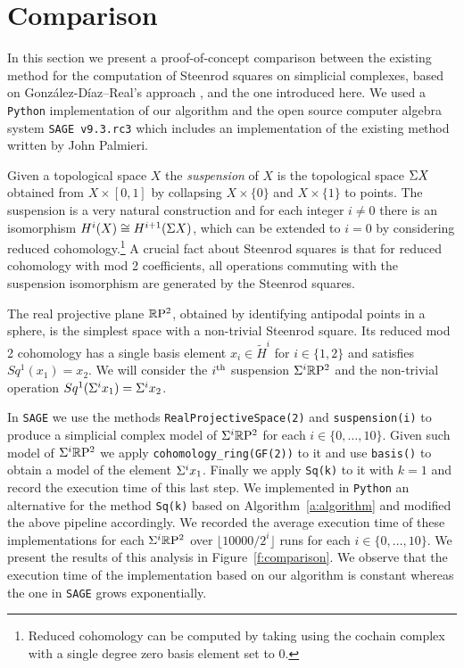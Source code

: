
\section{Comparison} \label{s:comparison}

In this section we present a proof-of-concept comparison between the existing method for the computation of Steenrod squares on simplicial complexes, based on Gonz\'alez-D\'iaz--Real's approach \cite[Corollary 3.2]{gonzalez1999combinatorial}, and the one introduced here.
We used a \verb|Python| implementation of our algorithm and the open source computer algebra system \verb|SAGE v9.3.rc3| \cite{sagemath} which includes an implementation of the existing method written by John Palmieri.

Given a topological space $X$ the \textit{suspension} of $X$ is the topological space $\Sigma X$ obtained from $X \times [0,1]$ by collapsing $X \times \{0\}$ and $X \times \{1\}$ to points.
The suspension is a very natural construction and for each integer $i \neq 0$ there is an isomorphism $H^i(X) \cong H^{i+1}(\Sigma X)$, which can be extended to $i = 0$ by considering reduced cohomology.\footnote{Reduced cohomology can be computed by taking using the cochain complex with a single degree zero basis element set to $0$.}
A crucial fact about Steenrod squares is that for reduced cohomology with mod 2 coefficients, all operations commuting with the suspension isomorphism are generated by the Steenrod squares.

The real projective plane $\mathbb{R}\mathrm{P}^2$, obtained by identifying antipodal points in a sphere, is the simplest space with a non-trivial Steenrod square.
Its reduced mod 2 cohomology has a single basis element $x_i \in \widetilde{H}^i$ for $i \in \{1, 2\}$ and satisfies $Sq^1(x_1) = x_2$.
We will consider the $i^\mathrm{th}$ suspension $\Sigma^i \mathbb{R}\mathrm{P}^2$ and the non-trivial operation $Sq^1(\Sigma^i x_1) = \Sigma^i x_2$.

In \verb|SAGE| we use the methods \verb|RealProjectiveSpace(2)| and \verb|suspension(i)| to produce a simplicial complex model of $\Sigma^i \mathbb{R}\mathrm{P}^2$ for each $i \in \{0, \dots, 10\}$.
Given such model of $\Sigma^i \mathbb{R}\mathrm{P}^2$ we apply \verb|cohomology_ring(GF(2))| to it and use \verb|basis()| to obtain a model of the element $\Sigma^i x_1$.
Finally we apply \verb|Sq(k)| to it with $k=1$ and record the execution time of this last step.
We implemented in \verb|Python| an alternative for the method \verb|Sq(k)| based on Algorithm~\ref{a:algorithm} and modified the above pipeline accordingly.
We recorded the average execution time of these implementations for each $\Sigma^i \mathbb{R}\mathrm{P}^2$ over $\lfloor 10000/2^i \rfloor$ runs for each $i \in \{0, \dots, 10\}$. We present the results of this analysis in Figure~\ref{f:comparison}.
We observe that the execution time of the implementation based on our algorithm is constant whereas the one in \verb|SAGE| grows exponentially.

